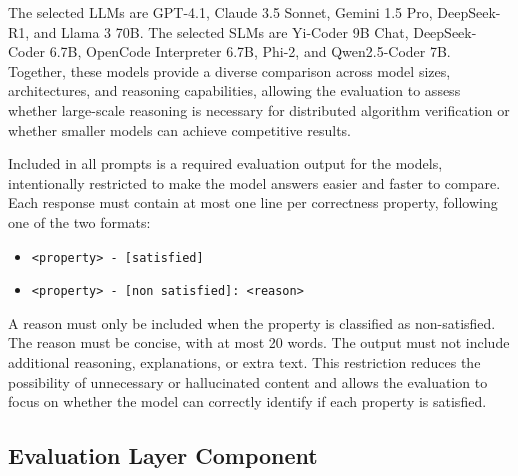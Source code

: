 The selected LLMs are GPT-4.1, Claude 3.5 Sonnet, Gemini 1.5 Pro, DeepSeek-R1, and Llama 3 70B. The selected SLMs are Yi-Coder 9B Chat, DeepSeek-Coder 6.7B, OpenCode Interpreter 6.7B, Phi-2, and Qwen2.5-Coder 7B. Together, these models provide a diverse comparison across model sizes, architectures, and reasoning capabilities, allowing the evaluation to assess whether large-scale reasoning is necessary for distributed algorithm verification or whether smaller models can achieve competitive results.

Included in all prompts is a required evaluation output for the models, intentionally restricted to make the model answers easier and faster to compare. Each response must contain at most one line per correctness property, following one of the two formats:

\begin{itemize}
    \item \texttt{<property> - [satisfied]}
    \item \texttt{<property> - [non satisfied]: <reason>}
\end{itemize}

A reason must only be included when the property is classified as non-satisfied. The reason must be concise, with at most 20 words. The output must not include additional reasoning, explanations, or extra text. This restriction reduces the possibility of unnecessary or hallucinated content and allows the evaluation to focus on whether the model can correctly identify if each property is satisfied.

\subsection{Evaluation Layer Component}

